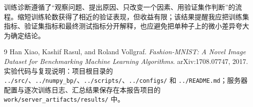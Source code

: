 \documentclass[dvipsnames,svgnames,a4paper,11pt]{article}
\begin{document}
训练诊断遵循了“观察问题、提出原因、只改变一个因素、用验证集作判断”的流程。缩短训练轮数获得了相近的验证表现，但收益有限；该结果提醒我应把训练集指标、验证集指标和最终测试指标分开解释，也应避免把单种子上的微小差异夸大为确定结论。

\begin{thebibliography}{9}
   Han Xiao, Kashif Rasul, and Roland Vollgraf. \emph{Fashion-MNIST: A Novel Image Dataset for Benchmarking Machine Learning Algorithms}. arXiv:1708.07747, 2017.
   实验代码与复现说明：项目根目录的 \texttt{../src/}、\texttt{../numpy\_bp/}、\texttt{../scripts/}、\texttt{../configs/} 和 \texttt{../README.md}；服务器配置与逐次训练日志、汇总结果保存在本报告项目的 \texttt{work/server\_artifacts/results/} 中。
\end{thebibliography}
\end{document}
